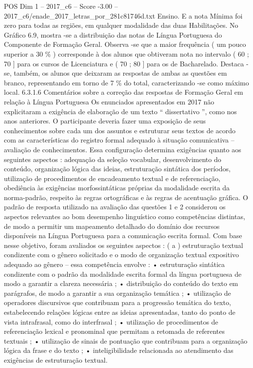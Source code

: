 \begin{textsample}{POS Dim 1 – 2017\_c6 – Score -3.00 – 2017\_c6/enade\_2017\_letras\_por\_281c81746d.txt}
Ensino.
E a nota Mínima foi zero para todas as regiões, em qualquer modalidade das duas Habilitações.
No Gráfico 6.9, mostra -se a distribuição das notas de Língua Portuguesa do Componente de Formação Geral.
Observa -se que a maior frequência ( um pouco superior a 30 \% ) corresponde à dos alunos que obtiveram nota no intervalo ( 60 ; 70 ] para os cursos de Licenciatura e ( 70 ; 80 ] para os de Bacharelado.
Destaca -se, também, os alunos que deixaram as respostas de ambas as questões em branco, representando em torno de 7 \% do total, caracterizando -se como máximo local. 6.3.1.6 Comentários sobre a correção das respostas de Formação Geral em relação à Língua Portuguesa Os enunciados apresentados em 2017 não explicitaram a exigência de elaboração de um texto “ dissertativo ”, como nos anos anteriores.
O participante deveria fazer uma exposição de seus conhecimentos sobre cada um dos assuntos e estruturar seus textos de acordo com as características do registro formal adequado à situação comunicativa – avaliação de conhecimentos.
Essa configuração determina exigências quanto aos seguintes aspectos : adequação da seleção vocabular, desenvolvimento do conteúdo, organização lógica das ideias, estruturação sintática dos períodos, utilização de procedimentos de encadeamento textual e de referenciação, obediência às exigências morfossintáticas próprias da modalidade escrita da norma-padrão, respeito às regras ortográficas e às regras de acentuação gráfica.
O padrão de resposta utilizado na avaliação das questões 1 e 2 considerou os aspectos relevantes ao bom desempenho linguístico como competências distintas, de modo a permitir um mapeamento detalhado do domínio dos recursos disponíveis na Língua Portuguesa para a comunicação escrita formal.
Com base nesse objetivo, foram avaliados os seguintes aspectos : ( a ) estruturação textual condizente com o gênero solicitado e o modo de organização textual expositivo adequado ao gênero – essa competência envolve : • estruturação sintática condizente com o padrão da modalidade escrita formal da língua portuguesa de modo a garantir a clareza necessária ; • distribuição do conteúdo do texto em parágrafos, de modo a garantir a sua organização temática ; • utilização de operadores discursivos que contribuam para a progressão temática do texto, estabelecendo relações lógicas entre as ideias apresentadas, tanto do ponto de vista intrafrasal, como do interfrasal ; • utilização de procedimentos de referenciação lexical e pronominal que permitam a retomada de referentes textuais ; • utilização de sinais de pontuação que contribuam para a organização lógica da frase e do texto ; • inteligibilidade relacionada ao atendimento das exigências de estruturação textual.

\end{textsample}
